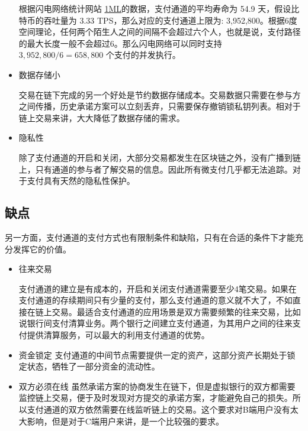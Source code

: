 \begin{itemize}
        根据闪电网络统计网站 \href{https://1ml.com/statistics}{1ML}的数据，支付通道的平均寿命为 54.9 天，假设比特币的吞吐量为 3.33 TPS，那么对应的支付通道上限为: 3,952,800。根据6度空间理论，任何两个陌生人之间的间隔不会超过六个人，也就是说，支付路径的最大长度一般不会超过6。那么闪电网络可以同时支持 $3,952,800/6 = 658,800$ 个支付的并发执行。
        
      \item 数据存储小

        交易在链下完成的另一个好处是节约数据存储成本。交易数据只需要在参与方之间传播，历史承诺方案可以立刻丢弃，只需要保存撤销锁私钥列表。相对于链上交易来讲，大大降低了数据存储的需求。

      \item 隐私性

        除了支付通道的开启和关闭，大部分交易都发生在区块链之外，没有广播到链上，只有通道的参与者了解交易的信息。因此所有微支付几乎都无法追踪。对于支付具有天然的隐私性保护。

\end{itemize}

\subsection{缺点}

另一方面，支付通道的支付方式也有限制条件和缺陷，只有在合适的条件下才能充分发挥它的价值。

\begin{itemize}
    \item 往来交易

        支付通道的建立是有成本的，开启和关闭支付通道需要至少4笔交易。如果在支付通道的存续期间只有少量的支付，那么支付通道的意义就不大了，不如直接在链上交易。最适合支付通道的应用场景是双方需要频繁的往来交易，比如说银行间支付清算业务。两个银行之间建立支付通道，为其用户之间的往来支付提供清算服务，可以最大的利用支付通道的优势。

    \item 资金锁定
        支付通道的中间节点需要提供一定的资产，这部分资产长期处于锁定状态，牺牲了一部分资金的流动性。
    
    \item 双方必须在线
        虽然承诺方案的协商发生在链下，但是虚拟银行的双方都需要监控链上交易，便于及时发现对方提交的承诺方案，才能避免自己的损失。所以支付通道的双方依然需要在线监听链上的交易。这个要求对B端用户没有太大影响，但是对于C端用户来讲，是一个比较强的要求。

\end{itemize}

